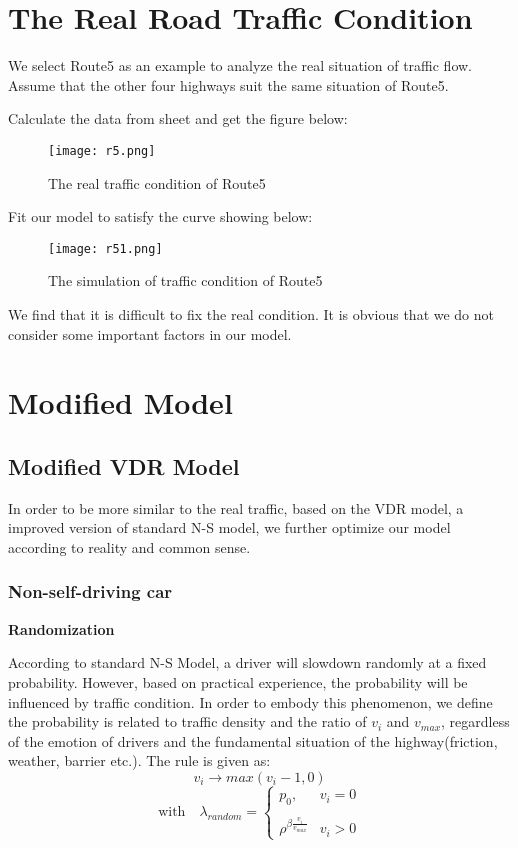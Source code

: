 \documentclass{mcmthesis}
\numberwithin{equation}{section}
\begin{document}
	\section{The Real Road Traffic Condition}
		We select Route5 as an example to analyze the real situation of traffic flow. Assume that the other four highways suit the same situation of Route5.

		Calculate the data from sheet and get the figure below:
		\begin{figure}[H]
			\begin{center}
				\texttt{[image: r5.png]}
				\caption{The real traffic condition of Route5}
			\end{center}
		\end{figure}

		Fit our model to satisfy the curve showing below:
		\begin{figure}[H]
			\begin{center}
				\texttt{[image: r51.png]}
				\caption{The simulation of traffic condition of Route5}
			\end{center}
		\end{figure}

		We find that it is difficult to fix the real condition. It is obvious that we do not consider some important factors in our model.


	\section{Modified Model}
		\subsection{Modified VDR Model}
			In order to be more similar to the real traffic, based on the VDR model, a improved version of standard N-S model, we further optimize our model according to reality and common sense.
			\subsubsection{Non-self-driving car}
				\noindent \textbf{Randomization}

					According to standard N-S Model, a driver will slowdown randomly at a fixed probability. However, based on practical experience, the probability will be influenced by traffic condition. In order to embody this phenomenon, we define the probability is related to traffic density and the ratio of $v_{i}$ and $v_{max}$, regardless of the emotion of drivers and the fundamental situation of the highway(friction, weather, barrier etc.). The rule is given as:
					\begin{equation}
						v_{i} \rightarrow max (v_{i}-1, 0) 
					\end{equation}
					\begin{equation}
						\text{with} \quad \lambda_{random} = \begin{cases} p_{0}, &v_{i}=0\\ \ \\ \rho^{\beta \frac{v_{i}}{v_{max}}}&v_{i}>0\end{cases}
					\end{equation}
						
\end{document}
